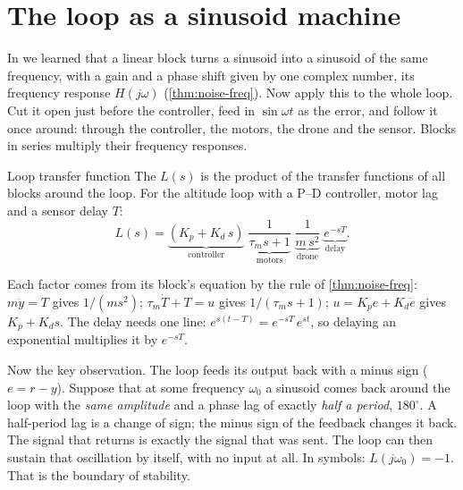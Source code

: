 \section{The loop as a sinusoid machine}

In  we learned that a linear block turns a sinusoid into a sinusoid of the same frequency, with a gain and a phase shift given by one complex number, its frequency response $H(j\omega)$ (\cref{thm:noise-freq}). Now apply this to the whole loop. Cut it open just before the controller, feed in $\sin\omega t$ as the error, and follow it once around: through the controller, the motors, the drone and the sensor. Blocks in series multiply their frequency responses.

\begin{definition}{Loop transfer function}
The  $L(s)$ is the product of the transfer functions of all blocks around the loop. For the altitude loop with a P–D controller, motor lag and a sensor delay $T$:
\begin{equation}\label{eq:slow-loop}
  L(s) = \underbrace{(K_p + K_d\,s)}_{\text{controller}}\;
  \underbrace{\frac{1}{\tau_m s + 1}}_{\text{motors}}\;
  \underbrace{\frac{1}{m\,s^2}}_{\text{drone}}\;
  \underbrace{e^{-sT}}_{\text{delay}} .
\end{equation}
\end{definition}

Each factor comes from its block's equation by the rule of \cref{thm:noise-freq}: $m\ddot y = T$ gives $1/(ms^2)$; $\tau_m\dot T + T = u$ gives $1/(\tau_ms + 1)$; $u = K_pe + K_d\dot e$ gives $K_p + K_ds$. The delay needs one line: $e^{s(t - T)} = e^{-sT}\,e^{st}$, so delaying an exponential multiplies it by $e^{-sT}$.

Now the key observation. The loop feeds its output back with a minus sign ($e = r - y$). Suppose that at some frequency $\omega_0$ a sinusoid comes back around the loop with the \emph{same amplitude} and a phase lag of exactly \emph{half a period}, $180^\circ$. A half-period lag is a change of sign; the minus sign of the feedback changes it back. The signal that returns is exactly the signal that was sent. The loop can then sustain that oscillation by itself, with no input at all. In symbols: $L(j\omega_0) = -1$. That is the boundary of stability.


